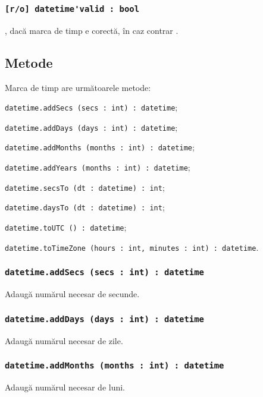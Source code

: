 \subsubsection{\lstinline|[r/o] datetime'valid : bool|}

\true, dacă marca de timp e corectă, în caz contrar \false.

\subsection{Metode}

Marca de timp are următoarele metode:
\begin{icItems}
	\item \lstinline|datetime.addSecs (secs : int) : datetime|;
	\item \lstinline|datetime.addDays (days : int) : datetime|;
	\item \lstinline|datetime.addMonths (months : int) : datetime|;
	\item \lstinline|datetime.addYears (months : int) : datetime|;
	\item \lstinline|datetime.secsTo (dt : datetime) : int|;
	\item \lstinline|datetime.daysTo (dt : datetime) : int|;
	\item \lstinline|datetime.toUTC () : datetime|;
	\item \lstinline|datetime.toTimeZone (hours : int, minutes : int) : datetime|.
\end{icItems}

\subsubsection{\lstinline|datetime.addSecs (secs : int) : datetime|}

Adaugă numărul necesar de secunde.

\subsubsection{\lstinline|datetime.addDays (days : int) : datetime|}

Adaugă numărul necesar de zile.

\subsubsection{\lstinline|datetime.addMonths (months : int) : datetime|}

Adaugă numărul necesar de luni.

